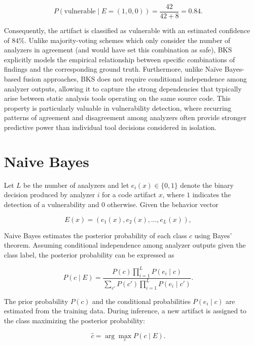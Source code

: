 \documentclass{article}
\begin{document}
\begin{equation}
P(\text{vulnerable} \mid E=(1,0,0))
=
\frac{42}{42+8}
=
0.84.
\end{equation}

Consequently, the artifact is classified as vulnerable with an estimated confidence of $84\%$.
Unlike majority-voting schemes which only consider the number of analyzers in agreement (and would have set this combination as safe),
BKS explicitly models the empirical relationship between specific combinations of findings and the corresponding ground truth.
Furthermore, unlike Na\"ive Bayes-based fusion approaches, BKS does not require conditional independence among analyzer outputs,
allowing it to capture the strong dependencies that typically arise between static analysis tools operating on the same source code.
This property is particularly valuable in vulnerability detection, where recurring patterns of agreement and disagreement
among analyzers often provide stronger predictive power than individual tool decisions considered in isolation.


\section{Naive Bayes}

Let $L$ be the number of analyzers and let $e_i(x)\in\{0,1\}$ denote the binary decision produced by analyzer $i$ for a code artifact $x$,
where $1$ indicates the detection of a vulnerability and $0$ otherwise.
Given the behavior vector

\begin{equation}
E(x) = (e_1(x), e_2(x), \ldots, e_L(x)),
\end{equation}

Naive Bayes estimates the posterior probability of each class $c$ using Bayes' theorem.
Assuming conditional independence among analyzer outputs given the class label,
the posterior probability can be expressed as

\begin{equation}
P(c \mid E)
=
\frac{P(c)\prod_{i=1}^{L}P(e_i \mid c)}
{\sum_{c'} P(c')\prod_{i=1}^{L}P(e_i \mid c')}.
\end{equation}

The prior probability $P(c)$ and the conditional probabilities $P(e_i \mid c)$ are estimated from the training data.
During inference, a new artifact is assigned to the class maximizing the posterior probability:

\begin{equation}
\hat{c}
=
\arg\max_c P(c \mid E).
\end{equation}
\end{document}
